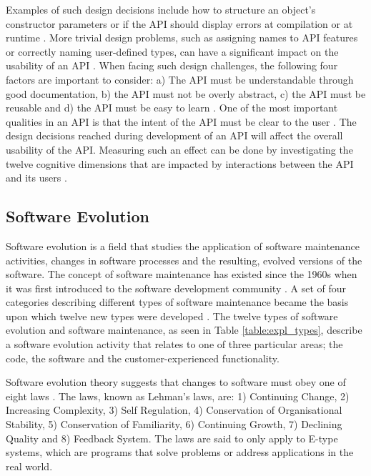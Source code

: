 \documentclass{sig-alternate}
\begin{document}
Examples of such design decisions include how to structure an object's constructor parameters or if the API should display errors at compilation or at runtime \cite{stylos2006comparing}. More trivial design problems, such as assigning names to API features or correctly naming user-defined types, can have a significant impact on the usability of an API \cite{shi2011empirical}. When facing such design challenges, the following four factors are important to consider: a) The API must be understandable through good documentation, b) the API must not be overly abstract, c) the API must be reusable and d) the API must be easy to learn \cite{shi2011empirical}. One of the most important qualities in an API is that the intent of the API must be clear to the user \cite{stylos2006comparing, shi2011empirical}. The design decisions reached during development of an API will affect the overall usability of the API. Measuring such an effect can be done by investigating the twelve cognitive dimensions that are impacted by interactions between the API and its users \cite{clarke2004measuring}. 


\subsection{Software Evolution} \label{software_evolution}
Software evolution is a field that studies the application of software maintenance activities, changes in software processes and the resulting, evolved versions of the software. The concept of software maintenance has existed since the 1960s when it was first introduced to the software development community \cite{lientz1980software}. A set of four categories describing different types of software maintenance \cite{lientz1980software} became the basis upon which twelve new types were developed \cite{chapin2001types}. The twelve types of software evolution and software maintenance, as seen in Table \ref{table:expl_types}, describe a software evolution activity that relates to one of three particular areas; the code, the software and the customer-experienced functionality. 

Software evolution theory suggests that changes to software must obey one of eight laws \cite{lehman90sview}. The laws, known as Lehman's laws, are: 1) Continuing Change, 2) Increasing Complexity, 3) Self Regulation, 4) Conservation of Organisational Stability, 5) Conservation of Familiarity, 6) Continuing Growth, 7) Declining Quality and 8) Feedback System. The laws are said to only apply to E-type systems, which are programs that solve problems or address applications in the real world.     
\end{document}
